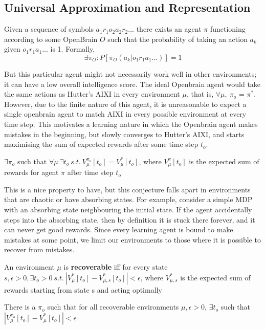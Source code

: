 \subsection{Universal Approximation and Representation}

\begin{conjecture}
Given a sequence of symbols $a_1r_1o_2a_2r_2...$ there exists an agent $\pi$ functioning according to some OpenBrain $O$ such that the probability of taking an action $a_k$ given $o_1r_1a_1...$ is 1. Formally, 
$$\exists \pi_{O} : P[\pi_{O}(a_k|o_1r_1a_1...)] = 1$$ 
\end{conjecture}

But this particular agent might not necessarily work well in other environments; it can have a low overall intelligence score. The ideal Openbrain agent would take the same actions as Hutter's AIXI in every environment $\mu$, that is, $\forall \mu,\ \pi_o$ = $\pi^*$. However, due to the finite nature of this agent, it is unreasonable to expect a single openbrain agent to match AIXI in every possible environment at every time step. This motivates a learning nature in which the Openbrain agent makes mistakes in the beginning, but slowly converges to Hutter's AIXI, and starts maximising the sum of expected rewards after some time step $t_o$.

\begin{conjecture}
    $\exists \pi_o$ such that $\forall \mu \ \exists t_o \ s.t.\  V_\mu^{\pi_o}[t_o] = V_\mu^*[t_o] $, where $V_\mu^{\pi}[t_o]$ is the expected sum of rewards for agent $\pi$ after time step $t_o$
\end{conjecture}

This is a nice property to have, but this conjecture falls apart in environments that are chaotic or have absorbing states. For example, consider a simple MDP with an absorbing state neighbouring the initial state. If the agent accidentally steps into the absorbing state, then by definition it is stuck there forever, and it can never get good rewards. Since every learning agent is bound to make mistakes at some point, we limit our environments to those where it is possible to recover from mistakes.

\begin{definition}
    An environment $\mu$ is \textbf{recoverable} iff for every state $s, \epsilon > 0, \exists t_o > 0\  s.t.\ |V_\mu^*[t_o]-V_{\mu,s}^*[t_o]| < \epsilon$, where $V_{\mu,s}^*$ is the expected sum of rewards starting from state s and acting optimally
\end{definition}


\begin{conjecture}
    There is a $\pi_o$ such that for all recoverable environments $\mu, \epsilon > 0$, $\exists t_o$ such that $|V_\mu^{\pi_o}[t_o]-V_\mu^*[t_o]|<\epsilon$
\end{conjecture}